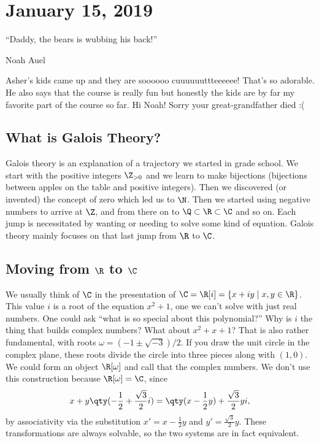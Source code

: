 
\section{January 15, 2019}

\epigraph{``Daddy, the bears is wubbing his back!''}{Noah Auel}

Asher's kids came up and they are soooooo cuuuuuuttteeeeee! That's so adorable. He also says that the course is really fun but honestly the kids are by far my favorite part of the course so far. Hi Noah! Sorry your great-grandfather died :(

\subsection{What is Galois Theory?}

Galois theory is an explanation of a trajectory we started in grade school. We start with the positive integers $\Z_{>0}$ and we learn to make bijections (bijections between apples on the table and positive integers). Then we discovered (or invented) the concept of zero which led us to $\N$. Then we started using negative numbers to arrive at $\Z$, and from there on to $\Q \subset \R \subset \C$ and so on. Each jump is necessitated by wanting or needing to solve some kind of equation. Galois theory mainly focuses on that last jump from $\R$ to $\C$.

\subsection{Moving from \texorpdfstring{$\R$ to $\C$}{R to C}}

We usually think of $\C$ in the presentation of $\C = \R[i] = \{x+iy \mid x,y \in \R\}$. This value $i$ is a root of the equation $x^2+1$, one we can't solve with just real numbers. One could ask ``what is so special about this polynomial?'' Why is $i$ the thing that builds complex numbers? What about $x^2 + x + 1$? That is also rather fundamental, with roots $\omega = (-1 \pm \sqrt{-3})/2$. If you draw the unit circle in the complex plane, these roots divide the circle into three pieces along with $(1,0)$. We could form an object $\R[\omega]$ and call that the complex numbers. We don't use this construction because $\R[\omega] = \C$, since 
\[ x + y\qty(-\frac{1}{2} + \frac{\sqrt{3}}{2}i) = \qty(x-\frac{1}{2}y) + \frac{\sqrt{3}}{2}yi, \]
by associativity via the substitution $x' = x-\frac{1}{2}y$ and $y' = \frac{\sqrt{3}}{2}y$. These transformations are always solvable, so the two systems are in fact equivalent.

